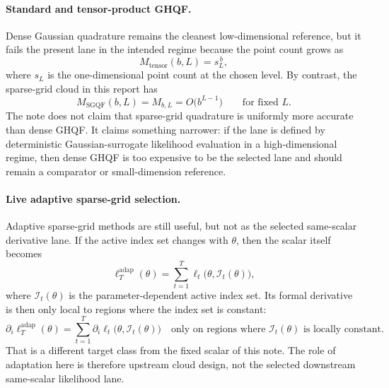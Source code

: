 \documentclass[11pt]{article}
\numberwithin{equation}{section}
\begin{document}
\paragraph{Standard and tensor-product GHQF.}
Dense Gaussian quadrature remains the cleanest low-dimensional reference, but it
fails the present lane in the intended regime because the point count grows as
\begin{equation}
  M_{\mathrm{tensor}}(b,L)=s_L^{\,b},
  \label{eq:p32-selection-tensor-growth}
\end{equation}
where \(s_L\) is the one-dimensional point count at the chosen level.  By
contrast, the sparse-grid cloud in this report has
\begin{equation}
  M_{\mathrm{SGQF}}(b,L)=M_{b,L}=O\!\bigl(b^{L-1}\bigr)
  \qquad\text{for fixed }L.
  \label{eq:p32-selection-sparse-growth}
\end{equation}
The note does not claim that sparse-grid quadrature is uniformly more accurate
than dense GHQF.  It claims something narrower: if the lane is defined by
deterministic Gaussian-surrogate likelihood evaluation in a high-dimensional
regime, then dense GHQF is too expensive to be the selected lane and should
remain a comparator or small-dimension reference.

\paragraph{Live adaptive sparse-grid selection.}
Adaptive sparse-grid methods are still useful, but not as the selected
same-scalar derivative lane.  If the active index set changes with \(\theta\),
then the scalar itself becomes
\begin{equation}
  \ell_T^{\mathrm{adap}}(\theta)
  =
  \sum_{t=1}^T \ell_t\bigl(\theta,\mathcal I_t(\theta)\bigr),
  \label{eq:p32-selection-adaptive-scalar}
\end{equation}
where \(\mathcal I_t(\theta)\) is the parameter-dependent active index set.  Its
formal derivative is then only local to regions where the index set is constant:
\begin{equation}
  \partial_i \ell_T^{\mathrm{adap}}(\theta)
  =
  \sum_{t=1}^T
  \partial_i \ell_t\bigl(\theta,\mathcal I_t(\theta)\bigr)
  \quad\text{only on regions where }\mathcal I_t(\theta)\text{ is locally constant.}
  \label{eq:p32-selection-adaptive-derivative}
\end{equation}
That is a different target class from the fixed scalar of this note.  The role of
adaptation here is therefore upstream cloud design, not the selected downstream
same-scalar likelihood lane.
\end{document}
